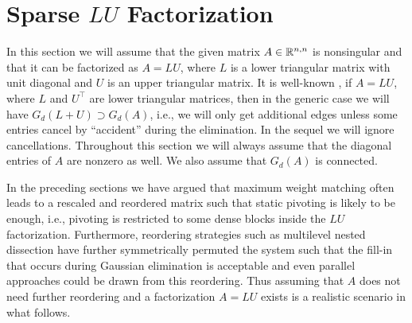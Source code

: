 \section{Sparse $LU$ Factorization }
\label{sec:lu}
In this section we will assume that the given matrix $A\in\mathbb{R}^{n,n}$ is nonsingular and that it can be factorized as $A=LU$, where $L$ is a lower triangular matrix with unit diagonal and
$U$ is an upper triangular matrix. 
It is well-known \cite{GeoL81}, if $A=LU$, where $L$ and $U^\top$ are lower
triangular matrices, then in the generic case we will have
$G_d(L+U)\supset G_d(A)$, i.e., we will only get additional edges unless some
entries cancel by ``accident'' during the elimination. In the sequel
we will ignore cancellations. Throughout this section we will always assume
that the diagonal entries of $A$ are nonzero as well. We also assume that $G_d(A)$
is connected.


In the preceding sections we have argued that
maximum weight matching often leads to a rescaled and reordered matrix such that
static pivoting is likely to be enough, i.e., 
pivoting is restricted to some dense blocks inside the $LU$ factorization.
Furthermore, reordering strategies such as multilevel nested dissection have 
further symmetrically permuted the system such that the fill-in that occurs
during Gaussian elimination is acceptable and even parallel approaches could
be drawn from this reordering. Thus assuming that $A$ does not need further
reordering and a factorization $A=LU$ exists 
is a realistic scenario in what follows.






